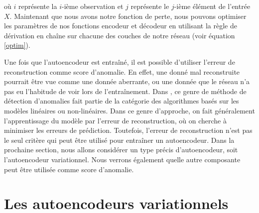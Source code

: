 où $i$ représente la $i$-ième observation et $j$ représente le $j$-ième élément de l'entrée $X$. Maintenant que nous avons notre fonction de perte, nous pouvons optimiser les paramètres de nos fonctions encodeur et décodeur en utilisant la règle de dérivation en chaîne sur chacune des couches de notre réseau (voir équation \ref{optim}).

Une fois que l'autoencodeur est entraîné, il est possible d'utiliser l'erreur de reconstruction comme score d'anomalie. En effet, une donné mal reconstruite pourrait être vue comme une donnée aberrante, ou une donnée que le réseau n'a pas eu l'habitude de voir lors de l'entraînement. Dans  \cite{10.5555/3086742}, ce genre de méthode de détection d'anomalies fait partie de la catégorie des algorithmes basés sur les modèles linéaires ou non-linéaires. Dans ce genre d'approche, on fait généralement l'apprentissage du modèle par l'erreur de reconstruction, où on cherche à minimiser les erreurs de prédiction. Toutefois, l'erreur de reconstruction n'est pas le seul critère qui peut être utilisé pour entraîner un autoencodeur. Dans la prochaine section, nous allons considérer un type précis d'autoencodeur, soit l'autoencodeur variationnel. Nous verrons également quelle autre composante peut être utilisée comme score d'anomalie.

\section{Les autoencodeurs variationnels} \label{background-vae}

